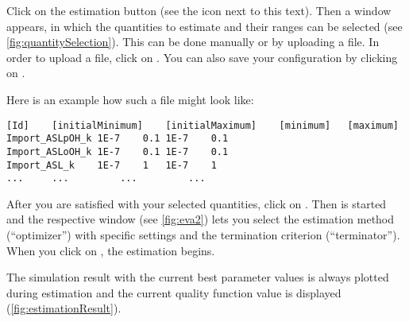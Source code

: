 Click on the estimation button (see the icon next to this text).
Then a window appears, in which the quantities to estimate and their ranges can be selected (see  \vref{fig:quantitySelection}).
This can be done manually or by uploading a \CSV file.
In order to upload a file, click on . You can also save your configuration by clicking on .

 Here is an example how such a file might look like:
\begin{lstlisting}[caption={Input file example for parameter estimation file},label={lst:input:estimation},numbers=none,captionpos=t,float=h]
[Id]	[initialMinimum]	[initialMaximum]	[minimum]	[maximum]
Import_ASLpOH_k	1E-7	0.1	1E-7	0.1	
Import_ASLoOH_k	1E-7	0.1	1E-7	0.1	
Import_ASL_k	1E-7	1	1E-7	1	
...     ...         ...         ...
\end{lstlisting}

After you are satisfied with your selected quantities, click on .
Then \EvA is started and the respective window (see \vref{fig:eva2}) lets you select the estimation method (``optimizer'') with specific settings   and the termination criterion (``terminator'').
When you click on , the estimation begins. 

The simulation result with the current best parameter values is always plotted during estimation and the current quality function value is displayed (\vref{fig:estimationResult}).

